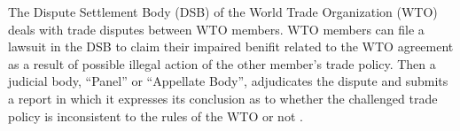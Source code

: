 The Dispute Settlement Body (DSB) of 
the World Trade Organization (WTO) deals 
with trade disputes between WTO members.
WTO members can file a lawsuit in the DSB to 
claim their impaired benifit related to the WTO agreement as a result of possible illegal action of the other member's trade policy.
Then a judicial body, ``Panel'' or ``Appellate Body'', 
adjudicates the dispute and submits a report in which it expresses
its conclusion as to whether the challenged 
trade policy is inconsistent to the rules of the WTO or not \citep{world2017handbook}.

 

